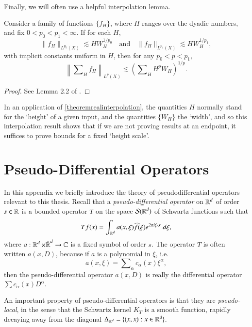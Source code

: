 Finally, we will often use a helpful interpolation lemma.

\begin{theorem} \label{theoremrealinterpolation}
    Consider a family of functions $\{ f_H \}$, where $H$ ranges over the dyadic numbers, and fix $0 < p_0 < p_1 < \infty$. If for each $H$,
    \[ \| f_H \|_{L^{p_0}(X)} \lesssim H W_H^{1/p_0} \quad\text{and}\quad \| f_H \|_{L^{p_1}(X)} \lesssim H W_H^{1/p_1}, \]
    with implicit constants uniform in $H$, then for any $p_0 < p < p_1$,
    \[ \left\| \sum\nolimits_H f_H \right\|_{L^p(X)} \lesssim \left( \sum\nolimits_H H^p W_H \right)^{1/p}. \]
\end{theorem}
\begin{proof}
    See Lemma 2.2 of \cite{HeoandNazarovandSeeger}.
\end{proof}

In an application of \ref{theoremrealinterpolation}, the quantities $H$ normally stand for the `height' of a given input, and the quantities $\{ W_H \}$ the `width', and so this interpolation result shows that if we are not proving results at an endpoint, it suffices to prove bounds for a fixed `height scale'.

\renewcommand{\thechapter}{B}
\chapter{Pseudo-Differential Operators} \label{appendixpsueiodjaweiodj}

In this appendix we briefly introduce the theory of pseudodifferential operators relevant to this thesis. Recall that a \emph{pseudo-differential operator} on $\operatorname{\mathbb{R}}^d$ of order $s \in \operatorname{\mathbb{R}}$ is a bounded operator $T$ on the space $\mathcal{S}(\operatorname{\mathbb{R}}^d)$ of Schwartz functions such that
%
\begin{equation}
    Tf(x) = \int_{\operatorname{\mathbb{R}}^d} a(x,\xi) \widehat{f}(\xi) e^{2 \pi i \xi \cdot x}\; d\xi,
\end{equation}
%
where $a: \operatorname{\mathbb{R}}^d \times {\dot{\operatorname{\mathbb{R}}}^d} \to \operatorname{\mathbb{C}}$ is a fixed symbol of order $s$. The operator $T$ is often written $a(x,D)$, because if $a$ is a polynomial in $\xi$, i.e.
%
\begin{equation}
    a(x,\xi) = \sum\nolimits_\alpha c_\alpha(x) \xi^\alpha,
\end{equation}
%
then the pseudo-differential operator $a(x,D)$ is really the differential operator $\sum c_\alpha(x) D^\alpha$.

An important property of pseudo-differential operators is that they are \emph{pseudo-local}, in the sense that the Schwartz kernel $K_T$ is a smooth function, rapidly decaying away from the diagonal $\Delta_{\operatorname{\mathbb{R}}^d} = \{ (x,x): x \in \operatorname{\mathbb{R}}^d \}$. %
%
%

